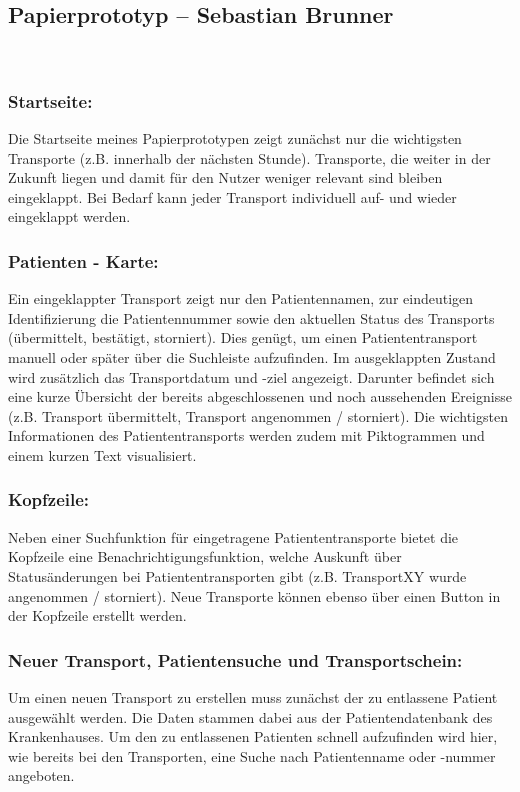 \documentclass[a4paper, ngerman, 12pt]{scrartcl}
\begin{document}
\subsection{Papierprototyp – Sebastian Brunner}
\begin{minipage}{\textwidth}
	\centering
	
	\label{img:brunner}
\end{minipage}\\[0.5em]
\subsubsection*{Startseite:}
Die Startseite meines Papierprototypen zeigt zunächst nur die wichtigsten Transporte (z.B. innerhalb der nächsten Stunde). Transporte, die weiter in der Zukunft liegen und damit für den Nutzer weniger relevant sind bleiben eingeklappt. Bei Bedarf kann jeder Transport individuell auf- und wieder eingeklappt werden.
\subsubsection*{Patienten - Karte:}
Ein eingeklappter Transport zeigt nur den Patientennamen, zur eindeutigen Identifizierung die Patientennummer sowie den aktuellen Status des Transports (übermittelt, bestätigt, storniert). Dies genügt, um einen Patiententransport manuell oder später über die Suchleiste aufzufinden. Im ausgeklappten Zustand wird zusätzlich das Transportdatum und -ziel angezeigt. Darunter befindet sich eine kurze Übersicht der bereits abgeschlossenen und noch aussehenden Ereignisse (z.B. Transport übermittelt, Transport angenommen / storniert). Die wichtigsten Informationen des Patiententransports werden zudem mit Piktogrammen und einem kurzen Text visualisiert.
\subsubsection*{Kopfzeile:}
Neben einer Suchfunktion für eingetragene Patiententransporte bietet die Kopfzeile eine Benachrichtigungsfunktion, welche Auskunft über Statusänderungen bei Patiententransporten gibt (z.B. TransportXY wurde angenommen / storniert). Neue Transporte können ebenso über einen Button in der Kopfzeile erstellt werden.
\subsubsection*{Neuer Transport, Patientensuche und Transportschein:}
Um einen neuen Transport zu erstellen muss zunächst der zu entlassene Patient ausgewählt werden. Die Daten stammen dabei aus der Patientendatenbank des Krankenhauses. Um den zu entlassenen Patienten schnell aufzufinden wird hier, wie bereits bei den Transporten, eine Suche nach Patientenname oder -nummer angeboten.\\
\end{document}
